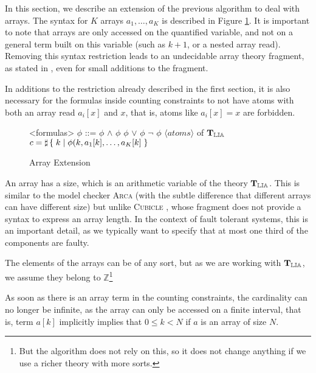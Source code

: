 
In this section, we describe an extension of the previous algorithm to
deal with arrays. The syntax for $K$ arrays $a_1, \ldots, a_K$ is
described in Figure \ref{syntaxarray}. It is important to note that
arrays are only accessed on the quantified variable, and not on a
general term built on this variable (such as $k + 1$, or a nested
array read). Removing this syntax restriction leads to an undecidable
array theory fragment, as stated in
\cite{bradley2006s}, even for small additions to the
fragment.

In additions to the restriction already described in the first section, it is also necessary for the
formulas inside counting constraints to not have atoms with both an array read $a_i[x]$ and $x$,
that is, atoms like $a_i[x] = x$ are forbidden.

\begin{figure}[h]
\begin{grammar}

<formulas> $\phi$ ::= $\phi$ $\land$ $\phi$
\alt $\phi$ $\lor$ $\phi$
\alt $\lnot$ $\phi$
\alt $\langle atoms\rangle$ of $\operatorname{\mathbf{T}_\mathbb{LIA}}$
\alt $c = \sharp\left\lbrace\;k\;|\;\phi(k, a_1[k], \ldots, a_K[k]\;\right\rbrace$

\end{grammar}
\caption{Array Extension}
\label{syntaxarray}
\end{figure}


An array has a size, which is an arithmetic variable of the theory
$\operatorname{\mathbf{T}_\mathbb{LIA}}$. This is similar to the model checker \textsc{Arca}
\cite{AlbertiGP16} (with the subtle difference that
different arrays can have different size) but unlike \textsc{Cubicle}
\cite{ConchonGKMZ12}, whose fragment does not
provide a syntax to express an array length. In the context of fault
tolerant systems, this is an important detail, as we typically want to
specify that at most one third of the components are faulty.

The elements of the arrays can be of any sort, but as we are working with
$\operatorname{\mathbf{T}_\mathbb{LIA}}$, we assume they belong to $\mathbb{Z}$\footnote{But the algorithm does
not rely on this, so it does not change anything if we use a richer theory with
more sorts.}

As soon as there is an array term in the counting constraints, the
cardinality can no longer be infinite, as the array can only be accessed
on a finite interval, that is, term $a[k]$ implicitly implies that $0 \le k < N$ if $a$ is an array of size $N$.


